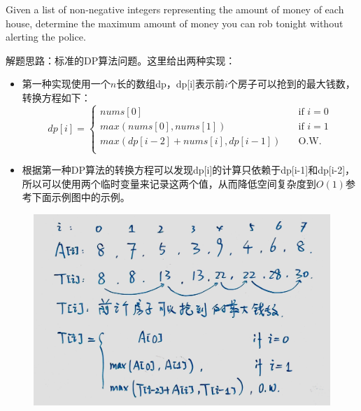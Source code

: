 \documentclass[a4paper,10pt]{article}
\begin{document}
\noindent Given a list of non-negative integers representing the amount of money of each house, determine the maximum amount of money you can rob tonight without alerting the police. \\

\begin{CJK*}{UTF8}{gbsn}
\noindent 解题思路：标准的DP算法问题。这里给出两种实现：
\begin{itemize}
    \item 第一种实现使用一个$n$长的数组dp，dp[i]表示前$i$个房子可以抢到的最大钱数，转换方程如下：
    \[ dp[i] =
      \begin{cases}
        nums[0]  & \quad \text{if } i=0\\
        max(nums[0],nums[1])  & \quad \text{if } i=1\\
        max(dp[i-2]+nums[i],dp[i-1])  & \quad \text{O.W. }\\
      \end{cases}
    \]
    
    \item 根据第一种DP算法的转换方程可以发现dp[i]的计算只依赖于dp[i-1]和dp[i-2]，所以可以使用两个临时变量来记录这两个值，从而降低空间复杂度到$O(1)$参考下面示例图中的示例。
\end{itemize}
\end{CJK*}

\begin{figure}[h]
    \includegraphics[width=\textwidth]{leetcode198.jpg}
    \centering\\
\end{figure}
\end{document}
